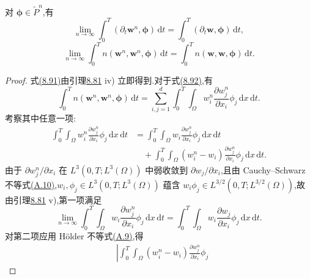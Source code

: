 \begin{lemma}[含时间导数与非线性对流项的双线性形式的收敛性]
\label{lem:smagorinsky-convection-convergence}
对 $\symbf{\phi}\in\widetilde{P}^n$,有
\begin{equation}\label{eq:smagorinsky-time-derivative-convergence}
 \lim_{n\to\infty}\int_0^T
       (\partial_t\bm{w}^n,\symbf{\phi})\,\mathrm{d}t
 =\int_0^T(\partial_t\bm{w},\symbf{\phi})\,\mathrm{d}t,
\end{equation}
\begin{equation}\label{eq:smagorinsky-convection-convergence}
 \lim_{n\to\infty}\int_0^T
       n(\bm{w}^n,\bm{w}^n,\symbf{\phi})\,\mathrm{d}t
 =\int_0^T n(\bm{w},\bm{w},\symbf{\phi})\,\mathrm{d}t.
\end{equation}
\begin{proof}
式\hyperref[eq:smagorinsky-time-derivative-convergence]{(8.91)}由引理\hyperref[lem:smagorinsky-convergent-subsequence]{8.81} iv) 立即得到.对于式\hyperref[eq:smagorinsky-convection-convergence]{(8.92)},有
\[
 \int_0^T n(\bm{w}^n,\bm{w}^n,\symbf{\phi})\,\mathrm{d}t
 =\sum_{i,j=1}^{d}\int_0^T\int_\Omega
       w_i^n\frac{\partial w_j^n}{\partial x_i}\phi_j
                         \,\mathrm{d}x\,\mathrm{d}t.
\]
考察其中任意一项:
\[
\begin{aligned}
 \int_0^T\int_\Omega
       w_i^n\frac{\partial w_j^n}{\partial x_i}\phi_j
                         \,\mathrm{d}x\,\mathrm{d}t
 &=\int_0^T\int_\Omega
       w_i\frac{\partial w_j^n}{\partial x_i}\phi_j
                         \,\mathrm{d}x\,\mathrm{d}t\\
 &\quad+\int_0^T\int_\Omega
       (w_i^n-w_i)\frac{\partial w_j^n}{\partial x_i}\phi_j
                         \,\mathrm{d}x\,\mathrm{d}t.
\end{aligned}
\]
由于 $\partial w_j^n/\partial x_i$ 在 $L^3(0,T;L^3(\Omega))$ 中弱收敛到 $\partial w_j/\partial x_i$,且由 Cauchy--Schwarz 不等式\hyperref[eq:appendix-a-10]{(A.10)},$w_i,\phi_j\in L^3(0,T;L^3(\Omega))$ 蕴含 $w_i\phi_j\in L^{3/2}(0,T;L^{3/2}(\Omega))$,故由引理\hyperref[lem:smagorinsky-convergent-subsequence]{8.81} v),第一项满足
\[
 \lim_{n\to\infty}\int_0^T\int_\Omega
       w_i\frac{\partial w_j^n}{\partial x_i}\phi_j
                            \,\mathrm{d}x\,\mathrm{d}t
 =\int_0^T\int_\Omega
       w_i\frac{\partial w_j}{\partial x_i}\phi_j
                            \,\mathrm{d}x\,\mathrm{d}t.
\]
对第二项应用 Hölder 不等式\hyperref[eq:appendix-a-9]{(A.9)},得
\[
\begin{aligned}
 &\left|\int_0^T\int_\Omega
       (w_i^n-w_i)\frac{\partial w_j^n}{\partial x_i}\phi_j

\end{aligned}\]
\end{proof}
\end{lemma}
